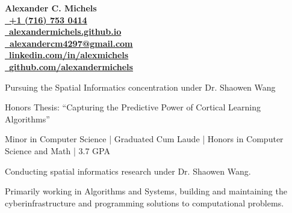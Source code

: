 \documentclass{acmresume}
\begin{document}
	
	\begin{multicols}{2}
		\vspace*{.1cm}
		\textbf{\Huge Alexander C. Michels}\\ \columnbreak
		\hfill\href{tel:17167530414}{\faPhone~\textbf{+1 (716) 753 0414}} \\
		\hfill\href{http://alexandermichels.github.io}{\faGlobeAmericas~\textbf{alexandermichels.github.io}} \\
		\hfill\href{mailto:alexandercm4297@gmail.com}{\textbf{\faEnvelope~alexandercm4297@gmail.com}} \\ \hfill\href{https://www.linkedin.com/in/alexmichels/}{\faLinkedin~\textbf{linkedin.com/in/alexmichels}} \\
		 \hfill\href{https://github.com/alexandermichels}{\faGithub \ \textbf{github.com/alexandermichels}}
	\end{multicols}
	
	
		\begin{titemize}
			\item{Pursuing the Spatial Informatics concentration under Dr. Shaowen Wang}
		\end{titemize}

        \begin{titemize}
            \item Honors Thesis: ``Capturing the Predictive Power of Cortical Learning Algorithms''
            \item{Minor in Computer Science | Graduated Cum Laude | Honors in Computer Science and Math | 3.7 GPA}
        \end{titemize}
	
	
        \begin{titemize}
            \item Conducting spatial informatics research under Dr. Shaowen Wang.
            \item Primarily working in Algorithms and Systems, building and maintaining the cyberinfrastructure and programming solutions to computational problems.
        \end{titemize}
		
\end{document}
